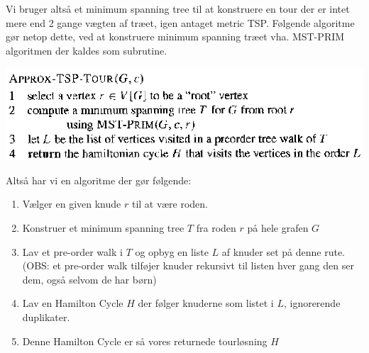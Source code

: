 Vi bruger altså et minimum spanning tree til at konstruere en tour der er intet mere end 2 gange vægten af træet, igen antaget metric TSP.
Følgende algoritme gør netop dette, ved at konstruere minimum spanning træet vha. MST-PRIM algoritmen der kaldes som subrutine.
\begin{center}
 \includegraphics[bb=0 0 754 196,scale=0.5]{./approxTSPTour.png}
\end{center}
Altså har vi en algoritme der gør følgende:
\begin{enumerate}
 \item Vælger en given knude $r$ til at være roden.
 \item Konstruer et minimum spanning tree $T$ fra roden $r$ på hele grafen $G$
 \item Lav et pre-order walk i $T$ og opbyg en liste $L$ af knuder set på denne rute. (OBS: et pre-order walk tilføjer knuder rekursivt til listen hver gang den ser dem, også selvom de har børn)
 \item Lav en Hamilton Cycle $H$ der følger knuderne som listet i $L$, ignorerende duplikater.
 \item Denne Hamilton Cycle er så vores returnede tourløsning $H$
\end{enumerate}

